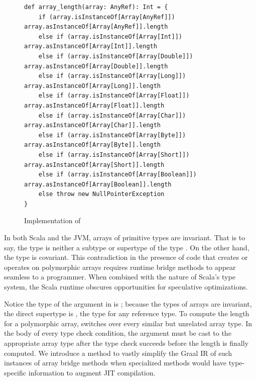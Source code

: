 \begin{figure}[!htb]
\begin{verbatim}
def array_length(array: AnyRef): Int = {
	if (array.isInstanceOf[Array[AnyRef]])       array.asInstanceOf[Array[AnyRef]].length
	else if (array.isInstanceOf[Array[Int]])     array.asInstanceOf[Array[Int]].length
	else if (array.isInstanceOf[Array[Double]])  array.asInstanceOf[Array[Double]].length
	else if (array.isInstanceOf[Array[Long]])    array.asInstanceOf[Array[Long]].length
	else if (array.isInstanceOf[Array[Float]])   array.asInstanceOf[Array[Float]].length
	else if (array.isInstanceOf[Array[Char]])    array.asInstanceOf[Array[Char]].length
	else if (array.isInstanceOf[Array[Byte]])    array.asInstanceOf[Array[Byte]].length
	else if (array.isInstanceOf[Array[Short]])   array.asInstanceOf[Array[Short]].length
	else if (array.isInstanceOf[Array[Boolean]]) array.asInstanceOf[Array[Boolean]].length
	else throw new NullPointerException
}
\end{verbatim}
\caption{Implementation of }
\label{impl:array-length}
\end{figure}

In both Scala and the JVM, arrays of primitive types are invariant.
That is to say, the type  is neither a subtype or supertype of the type .
On the other hand, the type  is covariant.
This contradiction in the presence of code that creates or operates on polymorphic arrays requires runtime bridge methods to appear seamless to a programmer.
When combined with the nature of Scala's type system, the Scala runtime obscures opportunities for speculative optimizations.

Notice the type of the argument in  is ; because the types of arrays are invariant, the direct supertype is , the type for any reference type.
To compute the length for a polymorphic array,  switches over every similar but unrelated array type.
In the body of every type check condition, the argument must be cast to the appropriate array type after the type check succeeds before the length is finally computed.
We introduce a method to vastly simplify the Graal IR of such instances of array bridge methods when specialized methods would have type-specific information to augment JIT compilation.

